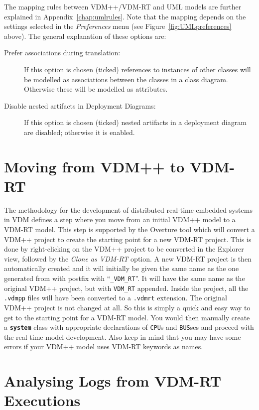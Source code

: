 \documentclass{overturerepchap}
\begin{document}
The mapping rules between VDM++/VDM-RT and UML models are further explained 
in Appendix~\ref{chap:umlrules}. Note that the mapping depends on the settings
selected in the \emph{Preferences} menu (see Figure~\ref{fig:UMLpreferences} 
above). The general explanation of these options are:

\begin{description}
\item[Prefer associations during translation:] If this option is chosen 
(ticked) references to instances of other classes will be modelled as
associations between the classes in a class diagram. Otherwise these will be 
modelled as attributes.
\item[Disable nested artifacts in Deployment Diagrams:] If this option
is chosen (ticked) nested artifacts in a deployment diagram are disabled; 
otherwise it is enabled.
\end{description}

\chapter{Moving from VDM++ to VDM-RT}\label{sec:ToVDMRT}

The methodology for the development of distributed real-time
embedded systems in VDM defines a step where you
move from an initial VDM++ model to a VDM-RT model\cite{Larsen&09b}. This
step is supported by the Overture tool which will convert
a VDM++ project to create the starting point for a new VDM-RT
project. This is done by right-clicking on the VDM++ project to be
converted in the Explorer view, followed by
the \emph{Clone as VDM-RT} option. A new VDM-RT project is then automatically
created and it will initially be given the same name as the one generated from 
with postfix with ``\texttt{\_VDM\_RT}''. It will have the
same name as the original VDM++ project, but with \texttt{VDM\_RT} appended.
Inside the project, all the \texttt{.vdmpp} files will have been converted
to a \texttt{.vdmrt} extension. The original VDM++ project is not
changed at all. So this is simply a quick and easy way to get to the
starting point for a VDM-RT model. You would then manually create
a {\textbf\texttt{system}} class with appropriate declarations of
\texttt{CPU}s and \texttt{BUS}ses and proceed with the real time
model development. Also keep in mind that you may have some errors
if your VDM++ model uses VDM-RT keywords as names.

\chapter{Analysing Logs from VDM-RT Executions}\label{sec:showlog}
\end{document}
